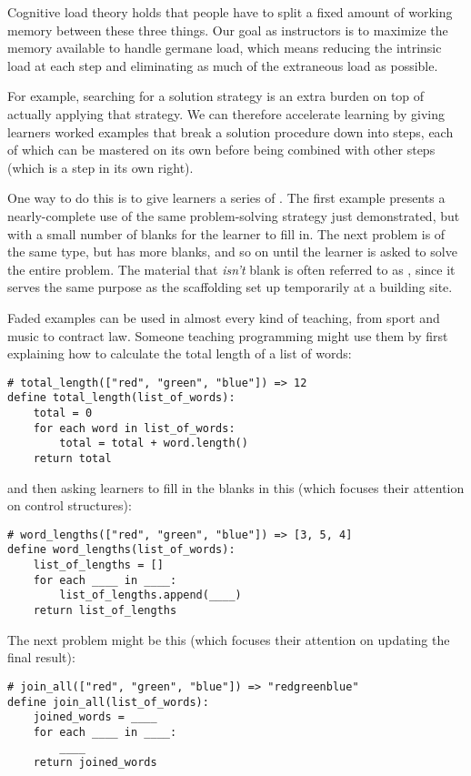 Cognitive load theory holds that people have to split a fixed amount of
working memory between these three things. Our goal as instructors is to
maximize the memory available to handle germane load, which means
reducing the intrinsic load at each step and eliminating as much of the
extraneous load as possible.

For example, searching for a solution strategy is an extra burden on top
of actually applying that strategy. We can therefore accelerate learning
by giving learners worked examples that break a solution procedure down
into steps, each of which can be mastered on its own before being
combined with other steps (which is a step in its own right).

One way to do this is to give learners a series of
. The first example
presents a nearly-complete use of the same problem-solving strategy just
demonstrated, but with a small number of blanks for the learner to fill
in. The next problem is of the same type, but has more blanks, and so on
until the learner is asked to solve the entire problem. The material
that \emph{isn't} blank is often referred to as
, since it serves the same
purpose as the scaffolding set up temporarily at a building site.

Faded examples can be used in almost every kind of teaching, from sport
and music to contract law. Someone teaching programming might use them
by first explaining how to calculate the total length of a list of
words:

\begin{verbatim}
# total_length(["red", "green", "blue"]) => 12
define total_length(list_of_words):
    total = 0
    for each word in list_of_words:
        total = total + word.length()
    return total
\end{verbatim}

and then asking learners to fill in the blanks in this (which focuses
their attention on control structures):

\begin{verbatim}
# word_lengths(["red", "green", "blue"]) => [3, 5, 4]
define word_lengths(list_of_words):
    list_of_lengths = []
    for each ____ in ____:
        list_of_lengths.append(____)
    return list_of_lengths
\end{verbatim}

The next problem might be this (which focuses their attention on
updating the final result):

\begin{verbatim}
# join_all(["red", "green", "blue"]) => "redgreenblue"
define join_all(list_of_words):
    joined_words = ____
    for each ____ in ____:
        ____
    return joined_words
\end{verbatim}

